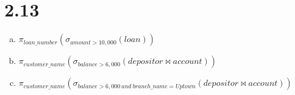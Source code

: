 \documentclass[12pt,letterpaper]{article}
\begin{document}
\section*{2.13}
 \begin{enumerate}[(a)]
 	\item $\pi_{loan\_number}(\sigma_{amount>10,000}(loan))$
 	
 	\item $\pi_{customer\_name}(\sigma_{balance>6,000}(depositor \bowtie account))$
 	
 	\item $\pi_{customer\_name}(\sigma_{balance>6,000 \ and \ branch\_name=Uptown}(depositor \bowtie account))$
 \end{enumerate}
\end{document}
